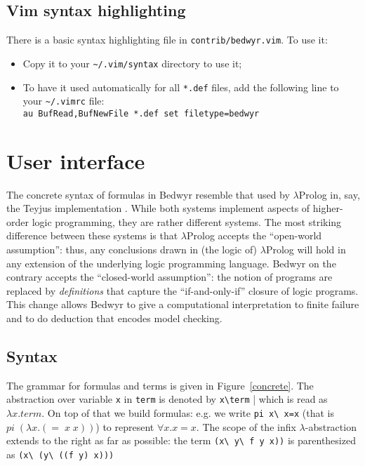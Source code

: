 \documentclass{article}
\begin{document}
\subsection{Vim syntax highlighting}

There is a basic syntax highlighting file in \verb;contrib/bedwyr.vim;.
To use it:
\begin{itemize}
\item
Copy it to your \verb|~/.vim/syntax| directory to use it;
\item
To have it used automatically for all \verb|*.def| files, add the
following line to your \verb;~/.vimrc; file:\\
\verb|au BufRead,BufNewFile *.def set filetype=bedwyr|
\end{itemize}


\section{User interface}
\label{sec:interface}

The concrete syntax of formulas in Bedwyr resemble that used by
$\lambda$Prolog in, say, the Teyjus implementation
\cite{nadathur99cade}.  While both systems implement aspects of
higher-order logic programming, they are rather different systems.
The most striking difference between these systems is that
$\lambda$Prolog accepts the ``open-world assumption'': thus, any
conclusions drawn in (the logic of) $\lambda$Prolog will hold in any
extension of the underlying logic programming language.  Bedwyr on the
contrary accepts the ``closed-world assumption'': the notion of
programs are replaced by {\em definitions} that capture the
``if-and-only-if'' closure of logic programs.  This change allows
Bedwyr to give a computational interpretation to finite failure and
to do deduction that encodes model checking.

\subsection{Syntax}

The grammar for formulas and terms is given in Figure~\ref{concrete}.
The abstraction over variable \verb.x. in \verb.term. is denoted by
\verb.x\term. | which is read as $\lambda x. term$. On top of that we
build formulas: e.g. we write \verb.pi x\ x=x.  (that is
$pi\;(\lambda{}x.(=\;x\;x))$) to represent $\forall x. x=x$.  The
scope of the infix $\lambda$-abstraction extends to the right as far
as possible: the term \verb.(x\ y\ f y x)). is parenthesized as
\verb.(x\ (y\ ((f y) x))).
\end{document}
